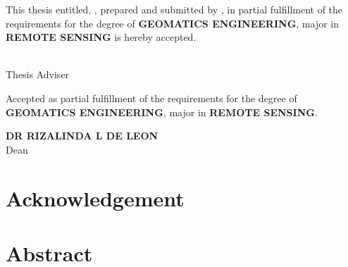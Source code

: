 \begin{singlespace}
This thesis entitled, \textbf{\MakeUppercase \thesistitle}, prepared and submitted by \textbf{\MakeUppercase \authorname}, in partial fulfillment of the requirements for the degree of \textbf{GEOMATICS ENGINEERING}, major in \textbf{REMOTE SENSING} is hereby accepted.
\end{singlespace}

\vspace*{1cm}

\begin{singlespace}
	{\noindent\hspace*{7cm}\textbf{\MakeUppercase \advisername}}\\
	{\hspace*{9.2cm}Thesis Adviser}
\end{singlespace}

\vspace*{6cm}

\begin{singlespace}
Accepted as partial fulfillment of the requirements for the degree of \textbf{GEOMATICS ENGINEERING}, major in \textbf{REMOTE SENSING}.
\end{singlespace}

\vspace*{1cm}

\begin{singlespace}
	{\noindent\hspace*{7.4cm}\textbf{\MakeUppercase {Dr Rizalinda L De Leon}}}\\
	{\hspace*{10.1cm}Dean}
\end{singlespace}


\newpage
\thispagestyle{empty}
\chapter*{Acknowledgement}



\newpage
\thispagestyle{empty}
\chapter*{Abstract}

